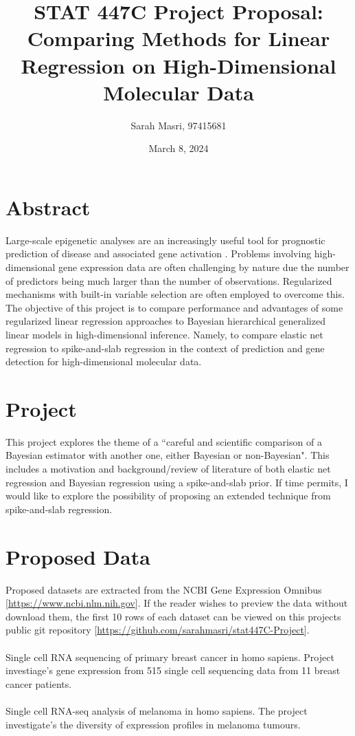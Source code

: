 \documentclass[12pt]{extarticle}
\title{\myfont STAT 447C Project Proposal: Comparing Methods for Linear Regression on High-Dimensional Molecular Data}
\author{Sarah Masri, 97415681}
\date{March 8, 2024}
\begin{document}
\maketitle

\section{Abstract}

\noindent Large-scale epigenetic analyses are an increasingly useful tool for prognostic prediction of disease and associated gene activation \cite{Tang2017}. Problems involving high-dimensional gene expression data are often challenging by nature due the number of predictors being much larger than the number of observations. Regularized mechanisms with built-in variable selection are often employed to overcome this. The objective of this project is to compare performance and advantages of some regularized linear regression approaches to Bayesian hierarchical generalized linear models in high-dimensional inference. Namely, to compare elastic net regression to spike-and-slab regression in the context of prediction and gene detection for high-dimensional molecular data. 

\section{Project}

\noindent This project explores the theme of a ``careful and scientific comparison of a Bayesian estimator with another one, either Bayesian or non-Bayesian". This includes a motivation and background/review of literature of both elastic net regression and Bayesian regression using a spike-and-slab prior. If time permits, I would like to explore the possibility of proposing an extended technique from spike-and-slab regression.  

\section{Proposed Data}
\noindent Proposed datasets are extracted from the NCBI Gene Expression Omnibus [\url{https://www.ncbi.nlm.nih.gov}]. If the reader wishes to preview the data without download them, the first 10 rows of each dataset can be viewed on this projects public git repository [\url{https://github.com/sarahmasri/stat447C-Project}]. 
\\
\\
  Single cell RNA sequencing of primary breast cancer in homo sapiens. Project investiage's gene expression from 515 single cell sequencing data from 11 breast cancer patients.
\newline [\url{https://www.ncbi.nlm.nih.gov/geo/query/acc.cgi?acc=GSE75688}]
\\
\\
 	Single cell RNA-seq analysis of melanoma in homo sapiens. The project investigate's the diversity of expression profiles in melanoma tumours.
\newline  [\url{https://www.ncbi.nlm.nih.gov/geo/query/acc.cgi?acc=GSE72056}]
\end{document}

